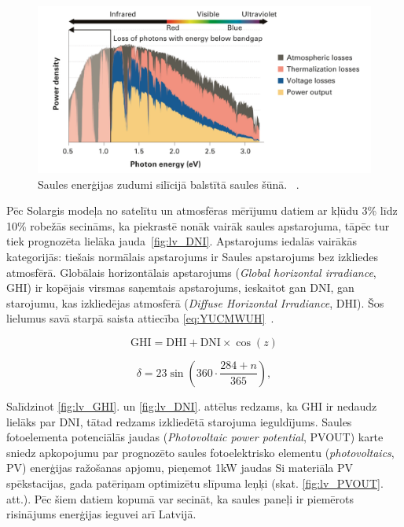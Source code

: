 \begin{figure}[h]
    \centering
    \includegraphics[width=\linewidth]{figures/misc/energyLosses.png}
    \caption{Saules enerģijas zudumi silīcijā balstītā saules šūnā.  ~\cite{Sivaram}.}
    \label{fig:zudumi}
\end{figure}


Pēc Solargis modeļa no satelītu un atmosfēras mērījumu datiem ar kļūdu 3\% līdz 10\% robežās secināms, ka piekrastē nonāk vairāk saules apstarojuma, tāpēc tur tiek prognozēta lielāka jauda~\ref{fig:lv_DNI}. Apstarojums iedalās vairākās kategorijās:
tiešais normālais apstarojums ir Saules apstarojums bez izkliedes atmosfērā.
Globālais horizontālais apstarojums (\textit{Global horizontal irradiance}, GHI) ir kopējais virsmas saņemtais apstarojums, ieskaitot gan DNI, gan starojumu, kas izkliedējas atmosfērā (\textit{Diffuse Horizontal Irradiance}, DHI). Šos lielumus savā starpā saista attiecība \ref{eq:YUCMWUH}~\cite{Sivaram}.

\begin{equation}
\label{eq:YUCMWUH}
\text{GHI}=\text{DHI} + \text{DNI}\times \cos(z)
\end{equation}



\begin{equation}
\label{eq:delta}
    \delta = 23 \sin \left( 360 \cdot \frac{284+n}{365} \right),
\end{equation}

Salīdzinot \ref{fig:lv_GHI}. un  \ref{fig:lv_DNI}. attēlus redzams, ka GHI ir nedaudz lielāks par DNI, tātad redzams izkliedētā starojuma ieguldījums. Saules fotoelementa potenciālās jaudas (\textit{Photovoltaic power potential}, PVOUT) karte sniedz apkopojumu par prognozēto saules fotoelektrisko elementu (\textit{photovoltaics}, PV) enerģijas ražošanas apjomu, pieņemot 1kW jaudas Si materiāla PV spēkstacijas, gada patēriņam optimizētu slīpuma leņķi (skat. \ref{fig:lv_PVOUT}. att.). Pēc šiem datiem kopumā var secināt, ka saules paneļi ir piemērots risinājums enerģijas ieguvei arī Latvijā.


